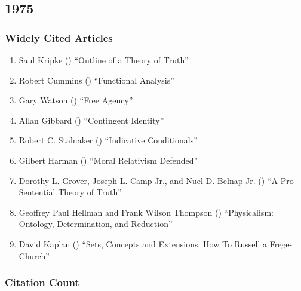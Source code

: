 \documentclass[
  10pt,
  letterpaper,
  DIV=11,
  numbers=noendperiod,
  twoside]{scrartcl}
\providecommand{\tightlist}{%
  \setlength{\itemsep}{0pt}\setlength{\parskip}{0pt}}\usepackage{longtable,booktabs,array}
\begin{document}
\newpage

\subsection{1975}\label{sec-s1975}

\subsubsection*{Widely Cited Articles}\label{widely-cited-articles-18}

\begin{enumerate}
\def\labelenumi{\arabic{enumi}.}
\tightlist
\item
  Saul Kripke () ``Outline of a
  Theory of Truth''
\item
  Robert Cummins () ``Functional
  Analysis''
\item
  Gary Watson () ``Free Agency''
\item
  Allan Gibbard () ``Contingent
  Identity''
\item
  Robert C. Stalnaker ()
  ``Indicative Conditionals''
\item
  Gilbert Harman () ``Moral
  Relativism Defended''
\item
  Dorothy L. Grover, Joseph L. Camp Jr., and Nuel D. Belnap Jr.
  () ``A Pro-Sentential Theory of
  Truth''
\item
  Geoffrey Paul Hellman and Frank Wilson Thompson
  () ``Physicalism: Ontology,
  Determination, and Reduction''
\item
  David Kaplan () ``Sets,
  Concepts and Extensions: How To Russell a Frege-Church''
\end{enumerate}

\subsubsection*{Citation Count}\label{sec-count-1975}
\end{document}
